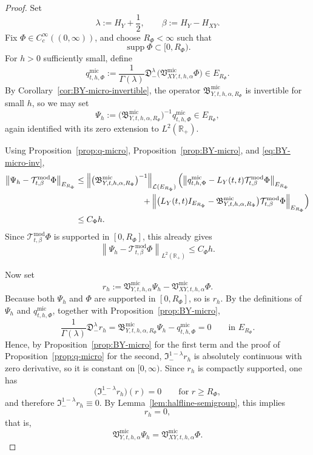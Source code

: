 \documentclass[11pt,a4paper]{amsart}
\theoremstyle{plain}
\theoremstyle{definition}
\theoremstyle{remark}
\newcommand{\R}{\mathbb{R}}
\begin{document}
\begin{proof}
Set
\[
\lambda:=H_Y+\frac12,
\qquad
\beta:=H_Y-H_{XY}.
\]
Fix \(\Phi\in C_c^\infty((0,\infty))\), and choose \(R_\Phi<\infty\) such that
\[
\operatorname{supp}\Phi\subset [0,R_\Phi).
\]
For \(h>0\) sufficiently small, define
\[
q_{t,h,\Phi}^{\mathrm{mic}}
:=
\frac{1}{\Gamma(\lambda)}
\mathfrak D_-^\lambda
\bigl(
\mathfrak V_{XY,t,h,\alpha}^{\mathrm{mic}}\Phi
\bigr)
\in E_{R_\Phi}.
\]
By Corollary~\ref{cor:BY-micro-invertible}, the operator
\(\mathfrak B_{Y,t,h,\alpha,R_\Phi}^{\mathrm{mic}}\) is invertible for small \(h\), so we may set
\[
\Psi_h
:=
\bigl(
\mathfrak B_{Y,t,h,\alpha,R_\Phi}^{\mathrm{mic}}
\bigr)^{-1}
q_{t,h,\Phi}^{\mathrm{mic}}
\in E_{R_\Phi},
\]
again identified with its zero extension to \(L^2(\R_+)\).

Using Proposition~\ref{prop:q-micro}, Proposition~\ref{prop:BY-micro}, and
\eqref{eq:BY-micro-inv},
\begin{align*}
\left\|
\Psi_h-\mathcal T_{t,\beta}^{\mathrm{mod}}\Phi
\right\|_{E_{R_\Phi}}
&\le
\left\|
\bigl(
\mathfrak B_{Y,t,h,\alpha,R_\Phi}^{\mathrm{mic}}
\bigr)^{-1}
\right\|_{\mathcal L(E_{R_\Phi})}
\Bigl(
\left\|
q_{t,h,\Phi}^{\mathrm{mic}}
-L_Y(t,t)\mathcal T_{t,\beta}^{\mathrm{mod}}\Phi
\right\|_{E_{R_\Phi}} \\
&\qquad\qquad\qquad\qquad
+\left\|
\bigl(
L_Y(t,t)I_{E_{R_\Phi}}
-\mathfrak B_{Y,t,h,\alpha,R_\Phi}^{\mathrm{mic}}
\bigr)
\mathcal T_{t,\beta}^{\mathrm{mod}}\Phi
\right\|_{E_{R_\Phi}}
\Bigr) \\
&\le
C_\Phi h.
\end{align*}
Since \(\mathcal T_{t,\beta}^{\mathrm{mod}}\Phi\) is supported in \([0,R_\Phi]\), this already
gives
\begin{equation}\label{eq:micro-psi-est}
\left\|
\Psi_h-\mathcal T_{t,\beta}^{\mathrm{mod}}\Phi
\right\|_{L^2(\R_+)}
\le
C_\Phi h.
\end{equation}

Now set
\[
r_h
:=
\mathfrak V_{Y,t,h,\alpha}^{\mathrm{mic}}\Psi_h
-\mathfrak V_{XY,t,h,\alpha}^{\mathrm{mic}}\Phi.
\]
Because both \(\Psi_h\) and \(\Phi\) are supported in \([0,R_\Phi]\), so is \(r_h\). By the
definitions of \(\Psi_h\) and \(q_{t,h,\Phi}^{\mathrm{mic}}\), together with
Proposition~\ref{prop:BY-micro},
\[
\frac{1}{\Gamma(\lambda)}
\mathfrak D_-^\lambda r_h
=
\mathfrak B_{Y,t,h,\alpha,R_\Phi}^{\mathrm{mic}}\Psi_h
-q_{t,h,\Phi}^{\mathrm{mic}}
=
0
\qquad\text{in }E_{R_\Phi}.
\]
Hence, by Proposition~\ref{prop:BY-micro} for the first term and the proof of
Proposition~\ref{prop:q-micro} for the second, \(\mathfrak I_-^{1-\lambda}r_h\) is absolutely
continuous with zero derivative, so it is constant on \([0,\infty)\). Since \(r_h\) is compactly supported, one has
\[
\bigl(
\mathfrak I_-^{1-\lambda}r_h
\bigr)(r)=0
\qquad\text{for }r\ge R_\Phi,
\]
and therefore \(\mathfrak I_-^{1-\lambda}r_h\equiv0\). By
Lemma~\ref{lem:halfline-semigroup}, this implies
\[
r_h=0,
\]
that is,
\begin{equation}\label{eq:micro-YX-eq}
\mathfrak V_{Y,t,h,\alpha}^{\mathrm{mic}}\Psi_h
=
\mathfrak V_{XY,t,h,\alpha}^{\mathrm{mic}}\Phi.
\end{equation}


\end{proof}
\end{document}
